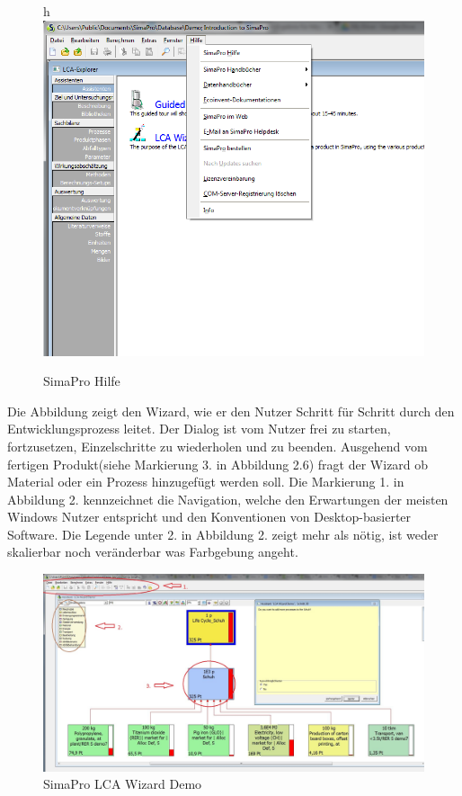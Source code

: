 \documentclass[a4paper, 12pt, twoside, BCOR=20mm, DIV=calc, abstracton, parskip=half*, toc=bibliography, toc=listof, headsepline, footsepline, headings=small, numbers=enddot]{scrreprt}
\begin{document}
\begin{figure}{h}
\centering
\includegraphics[width=\textwidth]{Bild/SimaPro Hilfe.png}
\caption{SimaPro Hilfe}
\end{figure}
Die Abbildung zeigt den Wizard, wie er den Nutzer Schritt für Schritt durch den Entwicklungsprozess leitet. Der Dialog ist vom Nutzer frei zu starten, fortzusetzen, Einzelschritte zu wiederholen und zu beenden. Ausgehend vom fertigen Produkt(siehe Markierung 3. in Abbildung 2.6) fragt der Wizard ob Material oder ein Prozess hinzugefügt werden soll.  
Die Markierung 1. in Abbildung 2. kennzeichnet die Navigation, welche den Erwartungen der meisten Windows Nutzer entspricht und den Konventionen von Desktop-basierter Software. 
Die Legende unter 2. in Abbildung 2. zeigt mehr als nötig, ist weder skalierbar noch veränderbar was Farbgebung angeht. 
\begin{figure}[h]
\centering
\includegraphics[width=\textwidth]{Bild/SimaPro LCA Demo Material Process.JPG}
\caption{SimaPro LCA Wizard Demo}
\end{figure}
\end{document}
